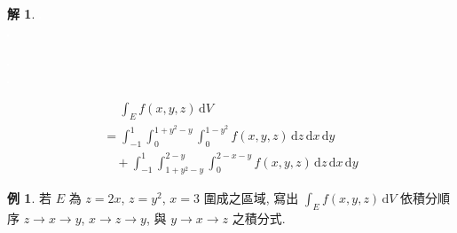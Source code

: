 \documentclass[12pt]{extarticle}
\newcommand{\ds}{\displaystyle}
\theoremstyle{definition}
\newtheorem*{ex}{例}
\newtheorem*{sol}{解}
\begin{document}
{\begin{sol}
  \begin{minipage}{0.25\textwidth}
    \includegraphics[scale=0.62,page=2]{fig/prob.pdf} \\
    \includegraphics[scale=0.56,page=3]{fig/prob.pdf} 
  \end{minipage}
  \begin{minipage}{0.25\textwidth}
    \includegraphics[scale=0.68,page=4]{fig/prob.pdf} \\
    \includegraphics[scale=0.68,page=5]{fig/prob.pdf} 
  \end{minipage}
  \quad
  \begin{minipage}{0.5\textwidth}
    \begin{align*}
      &\;\quad\int_E f(x, y, z)\,\text{d}V & \\
      &= \int_{-1}^1\int_0^{1 + y^2 - y}\!\!\int_0^{1 - y^2}\!\!f(x, y, z)\,\text{d}z\,\text{d}x\,\text{d}y \\
      &\quad + \int_{-1}^1\int_{1 + y^2 - y}^{2 - y}\int_0^{2 - x - y}\!\!f(x, y, z)\,\text{d}z\,\text{d}x\,\text{d}y 
    \end{align*}
  \end{minipage}
\end{sol}

\begin{ex}
  若 $E$ 為 $z = 2x$, $z = y^2$, $x = 3$ 圍成之區域, 寫出 $\ds\int_E f(x, y, z)\,\text{d}V$ 依積分順序 $z\to x\to y$, $x\to z\to y$, 與 $y\to x\to z$ 之積分式.
\end{ex}

}
\end{document}
